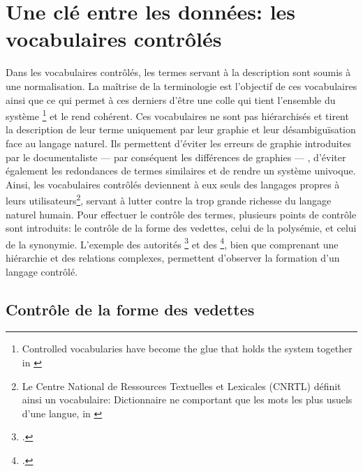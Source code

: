 \section{\label{I-A-2}Une clé entre les données: les vocabulaires contrôlés}

Dans les vocabulaires contrôlés, les termes servant à la description sont soumis à une normalisation. La maîtrise de la terminologie est l'objectif de ces vocabulaires ainsi que ce qui permet à ces derniers d'être une \og colle qui tient l'ensemble du système \footnote{\og Controlled vocabularies have become the glue that holds the system together \fg{} in \cite{rosenfeld_information_2015}}\fg{} et le rend cohérent. Ces vocabulaires ne sont pas hiérarchisés et tirent la description de leur terme uniquement par leur graphie et leur désambiguïsation face au langage naturel. Ils permettent d'éviter les erreurs de graphie introduites par le documentaliste --- par conséquent les différences de graphies --- , d'éviter également les redondances de termes similaires et de rendre un système univoque.
Ainsi, les vocabulaires contrôlés deviennent à eux seuls des langages propres à leurs utilisateurs\footnote{Le Centre National de Ressources Textuelles et Lexicales (CNRTL) définit ainsi un vocabulaire: \og Dictionnaire ne comportant que les mots les plus usuels d'une langue\fg{}, in \cite{cnrtl_definition_2020}}, servant à lutter contre la trop grande richesse du langage naturel humain.
Pour effectuer le contrôle des termes, plusieurs points de contrôle sont introduits: le contrôle de la forme des vedettes, celui de la polysémie, et celui de la synonymie. L'exemple des autorités \footcite{bibliotheque_nationale_de_france_rameau_nodate} et des \footcite{the_library_of_congress_library_nodate}, bien que comprenant une hiérarchie et des relations complexes, permettent d'observer la formation d'un langage contrôlé.

\subsection{Contrôle de la forme des vedettes}

